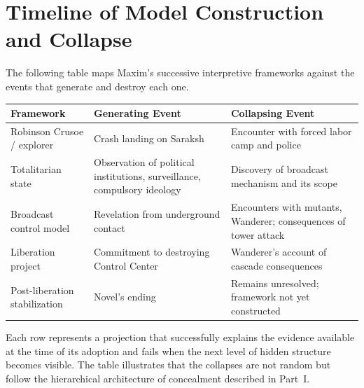 \documentclass[12pt, a4paper]{article}
\theoremstyle{plain}
\theoremstyle{definition}
\theoremstyle{remark}
\begin{document}
\section{Timeline of Model Construction and Collapse}

The following table maps Maxim's successive
interpretive frameworks against the events that
generate and destroy each one.

\medskip
\begin{center}
\begin{tabular}{p{3cm} p{4cm} p{4.5cm}}
\toprule
\textbf{Framework} & \textbf{Generating Event} &
\textbf{Collapsing Event} \\
\midrule
Robinson Crusoe / explorer & Crash landing on Saraksh &
Encounter with forced labor camp and police \\
\addlinespace
Totalitarian state & Observation of political institutions,
surveillance, compulsory ideology &
Discovery of broadcast mechanism and its scope \\
\addlinespace
Broadcast control model & Revelation from underground contact &
Encounters with mutants, Wanderer; consequences of tower attack \\
\addlinespace
Liberation project & Commitment to destroying Control Center &
Wanderer's account of cascade consequences \\
\addlinespace
Post-liberation stabilization & Novel's ending & Remains
unresolved; framework not yet constructed \\
\bottomrule
\end{tabular}
\end{center}
\medskip

Each row represents a projection that successfully
explains the evidence available at the time of
its adoption and fails when the next level of
hidden structure becomes visible. The table
illustrates that the collapses are not random
but follow the hierarchical architecture of
concealment described in Part~I.
\end{document}
